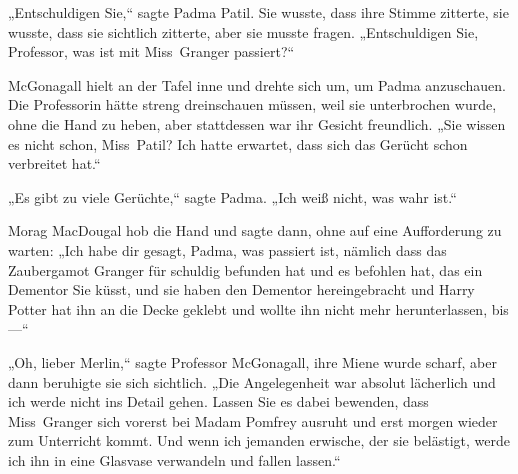 „Entschuldigen Sie,“ sagte Padma Patil. Sie wusste, dass ihre Stimme zitterte, sie wusste, dass sie sichtlich zitterte, aber sie musste fragen. „Entschuldigen Sie, Professor, was ist mit Miss~Granger passiert?“

McGonagall hielt an der Tafel inne und drehte sich um, um Padma anzuschauen. Die Professorin hätte streng dreinschauen müssen, weil sie unterbrochen wurde, ohne die Hand zu heben, aber stattdessen war ihr Gesicht freundlich.
„Sie wissen es nicht schon, Miss~Patil? Ich hatte erwartet, dass sich das Gerücht schon verbreitet hat.“

„Es gibt zu viele Gerüchte,“ sagte Padma. „Ich weiß nicht, was wahr ist.“

Morag MacDougal hob die Hand und sagte dann, ohne auf eine Aufforderung zu warten: „Ich habe dir gesagt, Padma, was passiert ist, nämlich dass das Zaubergamot Granger für schuldig befunden hat und es befohlen hat, das ein Dementor Sie küsst, und sie haben den Dementor hereingebracht und Harry Potter hat ihn an die Decke geklebt und wollte ihn nicht mehr herunterlassen, bis—“

„Oh, lieber Merlin,“ sagte Professor McGonagall, ihre Miene wurde scharf, aber dann beruhigte sie sich sichtlich. „Die Angelegenheit war absolut lächerlich und ich werde nicht ins Detail gehen. Lassen Sie es dabei bewenden, dass Miss~Granger sich vorerst bei Madam Pomfrey ausruht und erst morgen wieder zum Unterricht kommt. Und wenn ich jemanden erwische, der sie belästigt, werde ich ihn in eine Glasvase verwandeln und fallen lassen.“


